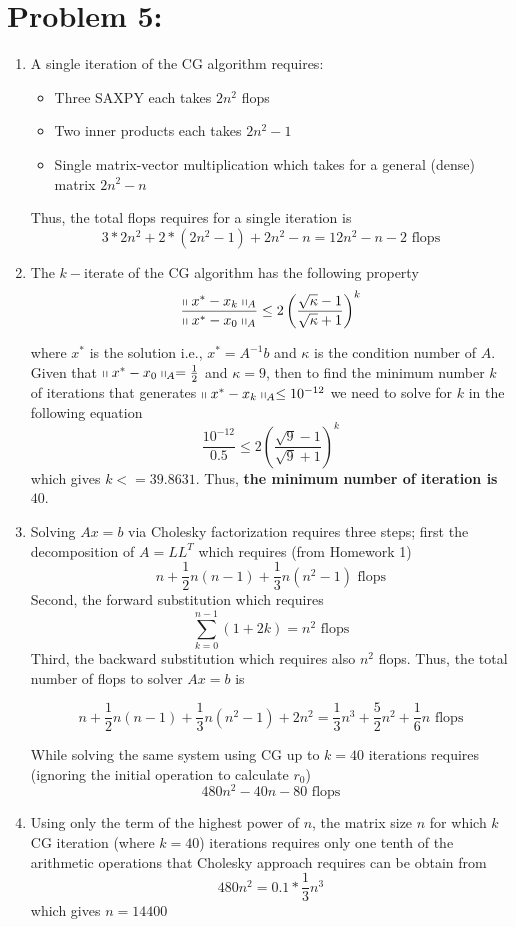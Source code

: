 \newpage
\section*{Problem 5:}
\begin{enumerate}
\item A single iteration of the CG algorithm requires:
\begin{itemize}
\item Three SAXPY each takes $2n^{2}$ flops
\item Two inner products each takes $2n^{2} -1$
\item Single matrix-vector multiplication which takes for a general (dense) matrix $2n^2-n$
\end{itemize}
Thus, the total flops requires for a single iteration is 
$$
3*2n^{2} + 2*(2n^{2} -1) + 2n^2-n = 12 n^{2} - n - 2 \text{\ flops}
$$

\item The $k-$iterate of the CG algorithm has the following property
$$
\frac{\shortparallel x^{*} - x_{k} \shortparallel_{A}}{\shortparallel x^{*} - x_{0} \shortparallel_{A}} \leq 2 \left( \frac{\sqrt{\kappa}-1}{\sqrt{\kappa}+1}\right) ^{k}
$$

where $x^{*}$ is the solution i.e.,  $x^{*} = A^{-1}b$ and $\kappa$ is the condition number of $A$. Given that $\shortparallel x^{*} - x_{0} \shortparallel_{A} = \frac{1}{2}$ and $\kappa = 9$, then to find the minimum number $k$ of iterations that generates $\shortparallel x^{*} - x_{k} \shortparallel_{A} \leq 10^{-12}$ we need to solve for $k$ in the following equation 
$$
\frac{10^{-12}}{0.5} \leq 2 \left( \frac{\sqrt{9}-1}{\sqrt{9}+1}\right) ^{k}
$$
which gives $k<= 39.8631$. Thus, \textbf{the minimum number of iteration is $40$}.

\item Solving $Ax = b$ via Cholesky factorization requires three steps; first the decomposition of $A = LL^{T}$ which requires (from Homework 1)
$$
n + \frac{1}{2}n(n-1) + \frac{1}{3}n(n^2-1) \text{\ flops}
$$
Second, the forward substitution which requires 
$$
\sum_{k=0}^{n-1}(1+2k) = n^{2} \text{\ flops}
$$
Third, the backward substitution which requires also $n^{2}$ flops. Thus, the total number of flops to solver $Ax = b$ is 

$$
n + \frac{1}{2}n(n-1) + \frac{1}{3}n(n^2-1) + 2n^{2} = \frac{1}{3}n^{3} + \frac{5}{2}n^{2} + \frac{1}{6}n \text{\ flops}
$$

While solving the same system using CG up to $k=40$ iterations requires (ignoring the initial operation to calculate $r_{0}$) 
$$
480 n^{2} - 40n - 80 \text{\ flops}
$$

\item Using only the term of the highest power of $n$, the matrix size $n$ for which $k$ CG iteration (where $k=40$) iterations requires only one tenth of the arithmetic operations that Cholesky approach requires can be obtain from 
$$
480n^{2} = 0.1*\frac{1}{3}n^{3}
$$
which gives $n=14400$
\end{enumerate} 